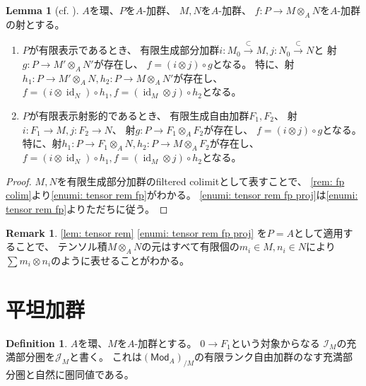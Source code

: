 \documentclass[uplatex]{jsarticle}
\theoremstyle{definition}
\newtheorem{lem}[lem]{Lemma}
\newtheorem{defi}[defi]{Definition}
\newtheorem{rem}[rem]{Remark}
\DeclareMathOperator{\id}{\mathrm{id}}
\newcommand{\Mod}{\mathsf{Mod}}
\newcommand{\mcI}{\mathcal{I}}
\newcommand{\mcJ}{\mathcal{J}}
\begin{document}
\begin{lem}[{cf. \cite[1.106]{GW}}]\label{lem: tensor rem}
  \(A\)を環、\(P\)を\(A\)-加群、
  \(M,N\)を\(A\)-加群、
  \(f:P\to M\otimes_AN\)を\(A\)-加群の射とする。
  \begin{enumerate}
    \item \label{enumi: tensor rem fp}
    \(P\)が有限表示であるとき、
    有限生成部分加群\(i:M_0\xrightarrow{\subset} M,j:N_0\xrightarrow{\subset} N\)と
    射\(g:P\to M'\otimes_AN'\)が存在し、
    \(f = (i\otimes j)\circ g\)となる。
    特に、射\(h_1:P\to M'\otimes_AN, h_2:P\to M\otimes_AN'\)が存在し、
    \(f = (i\otimes \id_N)\circ h_1, f = (\id_M\otimes j)\circ h_2\)となる。
    \item \label{enumi: tensor rem fp proj}
    \(P\)が有限表示射影的であるとき、
    有限生成自由加群\(F_1,F_2\)、
    射\(i:F_1\to M, j:F_2\to N\)、
    射\(g:P\to F_1\otimes_AF_2\)が存在し、
    \(f = (i\otimes j)\circ g\)となる。
    特に、射\(h_1:P\to F_1\otimes_AN, h_2:P\to M\otimes_AF_2\)が存在し、
    \(f = (i\otimes \id_N)\circ h_1, f = (\id_M\otimes j)\circ h_2\)となる。
  \end{enumerate}
\end{lem}

\begin{proof}
  \(M,N\)を有限生成部分加群のfiltered colimitとして表すことで、
  \autoref{rem: fp colim}より\ref{enumi: tensor rem fp}がわかる。
  \ref{enumi: tensor rem fp proj}は\ref{enumi: tensor rem fp}よりただちに従う。
\end{proof}


\begin{rem}
  \autoref{lem: tensor rem} \ref{enumi: tensor rem fp proj}
  を\(P=A\)として適用することで、
  テンソル積\(M\otimes_AN\)の元はすべて有限個の\(m_i\in M, n_i\in N\)により
  \(\sum m_i\otimes n_i\)のように表せることがわかる。
\end{rem}










\section{平坦加群}



\begin{defi}
  \(A\)を環、\(M\)を\(A\)-加群とする。
  \(0\to F_1\)という対象からなる
  \(\mcI_M\)の充満部分圏を\(\mcJ_M\)と書く。
  これは\((\Mod_A)_{/M}\)の有限ランク自由加群のなす充満部分圏と自然に圏同値である。
\end{defi}
\end{document}
